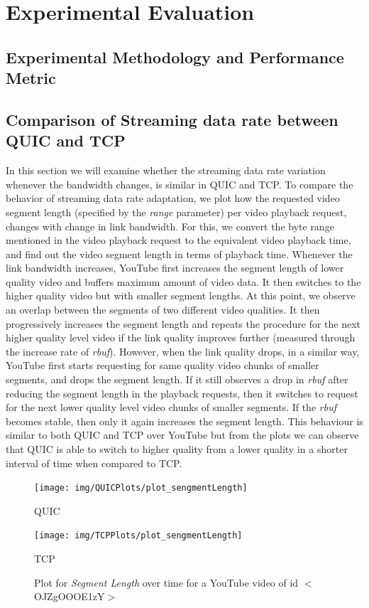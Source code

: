 \section{Experimental Evaluation}

\subsection{Experimental Methodology and Performance Metric}


\subsection{Comparison of Streaming data rate between QUIC and TCP}
In this section we will examine whether the streaming data rate variation  whenever the bandwidth changes, is similar in QUIC and TCP. To compare the behavior of streaming data rate adaptation, we plot how the requested video segment length (specified by the \textit{range} parameter) per video playback request, changes with change in link bandwidth. For this, we convert the byte range mentioned in the video playback request to the equivalent video playback time, and find out the video segment length in terms of playback time. Whenever the link bandwidth increases, YouTube first increases the segment length of lower quality video and buffers maximum amount of video data. It then switches to the higher quality video but with smaller segment lengths. At this point, we observe an overlap between the segments of two different video qualities. It then progressively increases the segment length and repeats the procedure for the next higher quality level video if the link quality improves further (measured through the increase rate of \textit{rbuf}). However, when the link quality drops, in a similar way, YouTube first starts requesting for same quality video chunks of smaller segments, and drops the segment length. If it still observes a drop in \textit{rbuf} after reducing the segment length in the playback requests, then it switches to request for the next lower quality level video chunks of smaller segments. If the \textit{rbuf} becomes stable, then only it again increases the segment length. This behaviour is similar to both QUIC and TCP over YouTube but from the plots we can observe that QUIC is able to switch to higher quality from a lower quality in a shorter interval of time when compared to TCP. 


\begin{figure}[!ht] 
\centering
\begin{minipage}{0.45\linewidth}
\texttt{[image: img/QUICPlots/plot\_sengmentLength]} 
\caption{QUIC}
\label{fig:seg1Q}
\end{minipage}
\begin{minipage}{0.45\linewidth}
\texttt{[image: img/TCPPlots/plot\_sengmentLength]}
\caption{TCP}
\label{fig:rseg1T}
\end{minipage} 
\caption{Plot for \textit{Segment Length} over time for a YouTube video of id $<$OJZgOOOE1zY$>$}
\label{fig:rser1}
\end{figure}

